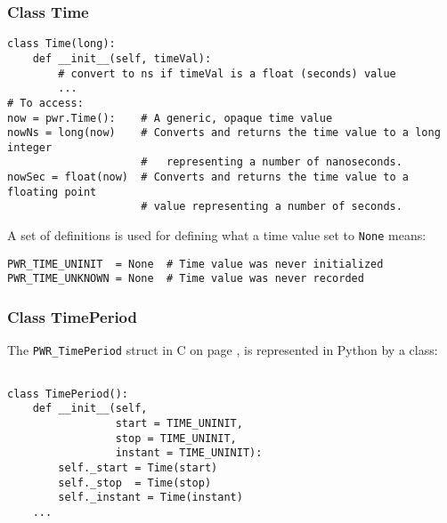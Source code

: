 \subsubsection{Class Time} \label{class:Time}

\begin{center}\begin{minipage}{.95\linewidth}\begin{lstlisting}
class Time(long):
    def __init__(self, timeVal):
        # convert to ns if timeVal is a float (seconds) value
        ...
# To access:
now = pwr.Time():    # A generic, opaque time value
nowNs = long(now)    # Converts and returns the time value to a long integer
                     #   representing a number of nanoseconds.
nowSec = float(now)  # Converts and returns the time value to a floating point
                     # value representing a number of seconds.
\end{lstlisting}\end{minipage}\end{center}

A set of definitions is used for defining what a time value set to
\texttt{None} means:

\begin{center}\begin{minipage}{.95\linewidth}\begin{lstlisting}
PWR_TIME_UNINIT  = None  # Time value was never initialized
PWR_TIME_UNKNOWN = None  # Time value was never recorded
\end{lstlisting}\end{minipage}\end{center}

\subsubsection{Class TimePeriod} \label{class:TimePeriod}

The \texttt{PWR_TimePeriod} struct in C on page \pageref{type:TimePeriod}, is
represented in Python by a class:

\begin{center}\begin{minipage}{.95\linewidth}\begin{lstlisting}

class TimePeriod():
    def __init__(self,
                 start = TIME_UNINIT,
                 stop = TIME_UNINIT,
                 instant = TIME_UNINIT):
        self._start = Time(start)
        self._stop  = Time(stop)
        self._instant = Time(instant)
    ...
\end{lstlisting}\end{minipage}\end{center}

